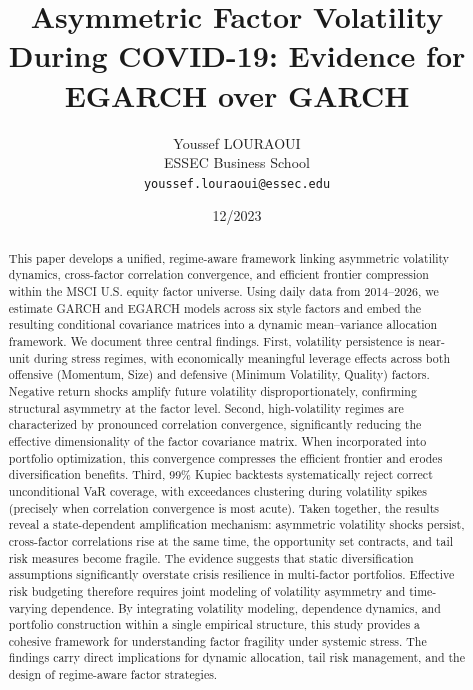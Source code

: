 \documentclass{article}
\title{Asymmetric Factor Volatility During COVID-19: Evidence for EGARCH over GARCH}
\author{
    Youssef LOURAOUI \\
    ESSEC Business School \\
    \texttt{youssef.louraoui@essec.edu}
}
\date{12/2023}
\begin{document}
\maketitle


\begin{abstract}
This paper develops a unified, regime-aware framework linking asymmetric volatility dynamics, cross-factor correlation convergence, and efficient frontier compression within the MSCI U.S. equity factor universe. Using daily data from 2014–2026, we estimate GARCH and EGARCH models across six style factors and embed the resulting conditional covariance matrices into a dynamic mean–variance allocation framework. We document three central findings. First, volatility persistence is near-unit during stress regimes, with economically meaningful leverage effects across both offensive (Momentum, Size) and defensive (Minimum Volatility, Quality) factors. Negative return shocks amplify future volatility disproportionately, confirming structural asymmetry at the factor level. Second, high-volatility regimes are characterized by pronounced correlation convergence, significantly reducing the effective dimensionality of the factor covariance matrix. When incorporated into portfolio optimization, this convergence compresses the efficient frontier and erodes diversification benefits. Third, 99\% Kupiec backtests systematically reject correct unconditional VaR coverage, with exceedances clustering during volatility spikes (precisely when correlation convergence is most acute). Taken together, the results reveal a state-dependent amplification mechanism: asymmetric volatility shocks persist, cross-factor correlations rise at the same time, the opportunity set contracts, and tail risk measures become fragile. The evidence suggests that static diversification assumptions significantly overstate crisis resilience in multi-factor portfolios. Effective risk budgeting therefore requires joint modeling of volatility asymmetry and time-varying dependence. By integrating volatility modeling, dependence dynamics, and portfolio construction within a single empirical structure, this study provides a cohesive framework for understanding factor fragility under systemic stress. The findings carry direct implications for dynamic allocation, tail risk management, and the design of regime-aware factor strategies.
\end{abstract}

\thispagestyle{empty}

\newpage 

\tableofcontents
\newpage
\end{document}
